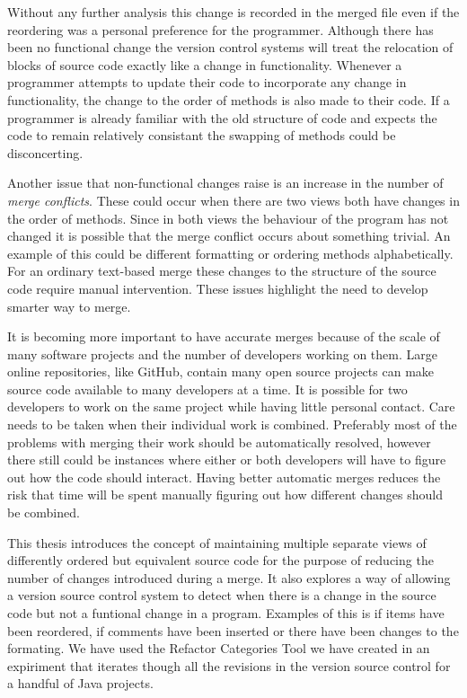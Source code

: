 Without any further analysis this change is recorded in the merged file even if the reordering was a personal preference for the programmer.  Although there has been no functional change the version control systems will treat the relocation of blocks of source code exactly like a change in functionality.  Whenever a programmer attempts to update their code to incorporate any change in functionality, the change to the order of methods is also made to their code.  If a programmer is already familiar with the old structure of code and expects the code to remain relatively consistant the swapping of methods could be disconcerting.

Another issue that non-functional changes raise is an increase in the number of \emph{merge conflicts}. These could occur when there are two views both have changes in the order of methods. Since in both views the behaviour of the program has not changed it is possible that the merge conflict occurs about something trivial. An example of this could be different formatting or ordering methods alphabetically. For an ordinary text-based merge these changes to the structure of the source code require manual intervention. These issues highlight the need to develop smarter way to merge.

It is becoming more important to have accurate merges because of the scale of many software projects and the number of developers working on them.  Large online repositories, like GitHub, contain many open source projects can make source code available to many developers at a time.  It is possible for two developers to work on the same project while having little personal contact. Care needs to be taken when their individual work is combined.  Preferably most of the problems with merging their work should be automatically resolved, however there still could be instances where either or both developers will have to figure out how the code should interact. Having better automatic merges reduces the risk that time will be spent manually figuring out how different changes should be combined.

This thesis introduces the concept of maintaining multiple separate views of differently ordered but equivalent source code for the purpose of reducing the number of changes introduced during a merge. 
It also explores a way of allowing a version source control system to detect when there is a change in the source code but not a funtional change in a program.  Examples of this is if items have been reordered, if comments have been inserted or there have been changes to the formating.  We have used the Refactor Categories Tool we have created in an expiriment that iterates though all the revisions in the version source control for a handful of Java projects.

% 

